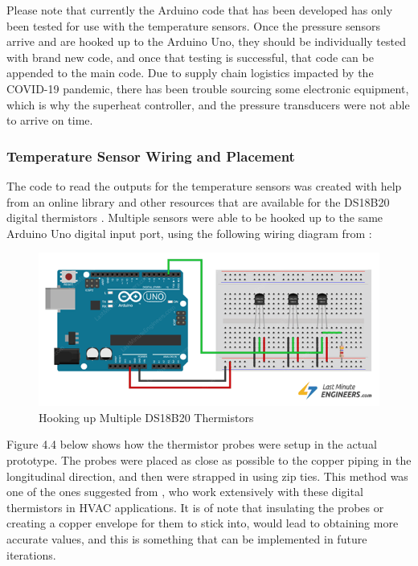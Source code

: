 \medskip
Please note that currently the Arduino code that has been developed has only been tested for use with the temperature sensors. Once the pressure sensors arrive and are hooked up to the Arduino Uno, they should be individually tested with brand new code, and once that testing is successful, that code can be appended to the main code. Due to supply chain logistics impacted by the COVID-19 pandemic, there has been trouble sourcing some electronic equipment, which is why the superheat controller, and the pressure transducers were not able to arrive on time.

\subsubsection{Temperature Sensor Wiring and Placement}
The code to read the outputs for the temperature sensors was created with help from an online library \cite{temp_library} and other resources that are available for the DS18B20 digital thermistors \cite{temp}. Multiple sensors were able to be hooked up to the same Arduino Uno digital input port, using the following wiring diagram from \cite{mult_temp}:

\medskip
\begin{figure}[H]
    \centering
    \includegraphics[width=12cm]{images/arduino_thermistors.png}
    \caption{Hooking up Multiple DS18B20 Thermistors \cite{mult_temp}}
\end{figure}

\medskip
Figure 4.4 below shows how the thermistor probes were setup in the actual prototype. The probes were placed as close as possible to the copper piping in the longitudinal direction, and then were strapped in using zip ties. This method was one of the ones suggested from \cite{temp_place}, who work extensively with these digital thermistors in HVAC applications. It is of note that insulating the probes or creating a copper envelope for them to stick into, would lead to obtaining more accurate values, and this is something that can be implemented in future iterations.

